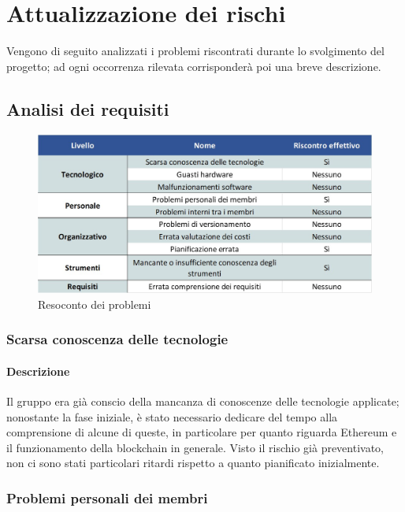 \newpage
\section{Attualizzazione dei rischi} \label{RiscontroRischi}

Vengono di seguito analizzati i problemi riscontrati durante lo svolgimento del progetto; ad ogni occorrenza rilevata corrisponderà poi una breve descrizione.\\

\subsection{Analisi dei requisiti}
\begin{figure}[h!]
	\centerline{\includegraphics[scale=0.55]{img/RiscontroProblemi.jpg}}
	\caption{Resoconto dei problemi}
	\label{fig:resoconto_probl}
\end{figure}

\subsubsection{Scarsa conoscenza delle tecnologie}
\paragraph {Descrizione}
Il gruppo era già conscio della mancanza di conoscenze delle tecnologie applicate; nonostante la fase iniziale, è stato necessario dedicare del tempo alla comprensione di alcune di queste, in particolare per quanto riguarda Ethereum e il funzionamento della blockchain in generale. Visto il rischio già preventivato, non ci sono stati particolari ritardi rispetto a quanto pianificato inizialmente.

\subsubsection{Problemi personali dei membri}
